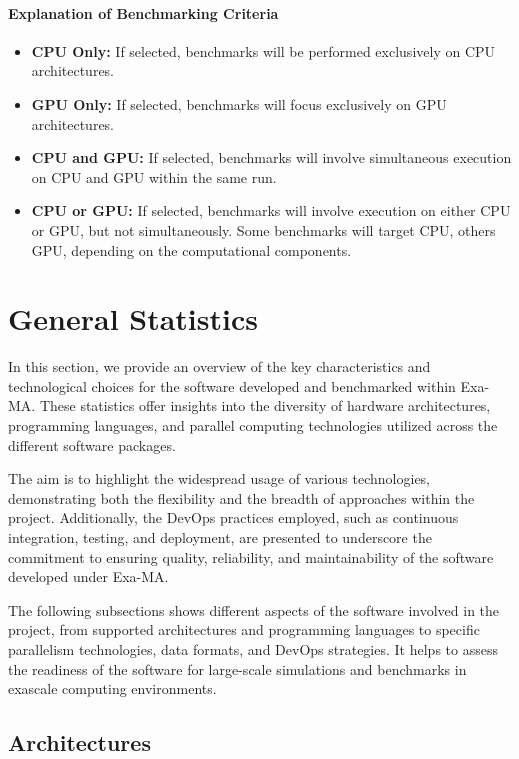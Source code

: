 \paragraph{Explanation of Benchmarking Criteria}
\begin{itemize}
    \item \textbf{CPU Only:} If selected, benchmarks will be performed exclusively on CPU architectures.
    \item \textbf{GPU Only:} If selected, benchmarks will focus exclusively on GPU architectures.
    \item \textbf{CPU and GPU:} If selected, benchmarks will involve simultaneous execution on CPU and GPU within the same run.
    \item \textbf{CPU or GPU:} If selected, benchmarks will involve execution on either CPU or GPU, but not simultaneously. Some benchmarks will target CPU, others GPU, depending on the computational components.
\end{itemize}


\section{General Statistics}
\label{sec:software:statistics}

In this section, we provide an overview of the key characteristics and technological choices for the software developed and benchmarked within Exa-MA. 
These statistics offer insights into the diversity of hardware architectures, programming languages, and parallel computing technologies utilized across the different software packages. 

The aim is to highlight the widespread usage of various technologies, demonstrating both the flexibility and the breadth of approaches within the project. 
Additionally, the DevOps practices employed, such as continuous integration, testing, and deployment, are presented to underscore the commitment to ensuring quality, reliability, and maintainability of the software developed under Exa-MA.

The following subsections shows different aspects of the software involved in the project, from supported architectures and programming languages to specific parallelism technologies, data formats, and DevOps strategies. 
It helps to assess the readiness of the software for large-scale simulations and benchmarks in exascale computing environments.


\subsection{Architectures}

